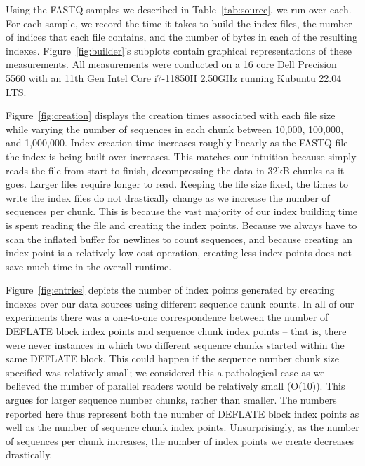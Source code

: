 Using the \gzip FASTQ samples we described in Table~\ref{tab:source}, we run
\ibuilder over each. For each sample, we record the time it takes to build the
index files, the number of indices that each file contains, and the number of
bytes in each of the resulting indexes. Figure~\ref{fig:builder}'s subplots
contain graphical representations of these measurements. All measurements were
conducted on a 16 core Dell Precision 5560 with an 11th Gen Intel Core i7-11850H
\@ 2.50GHz running Kubuntu 22.04 LTS.

Figure~\ref{fig:creation} displays the creation times associated with each file
size while varying the number of sequences in each chunk between 10,000,
100,000, and 1,000,000. Index creation time increases roughly linearly as the
\gzip FASTQ file the index is being built over increases. This matches our
intuition because \ibuilder simply reads the \gzip file from start to finish,
decompressing the data in 32kB chunks as it goes. Larger files require longer to
read. Keeping the file size fixed, the times to write the index files do not
drastically change as we increase the number of sequences per chunk. This is
because the vast majority of our index building time is spent reading the file
and creating the index points. Because we always have to scan the inflated
buffer for newlines to count sequences, and because creating an index point is a
relatively low-cost operation, creating less index points does not save much
time in the overall \ibuilder runtime.

Figure~\ref{fig:entries} depicts the number of index points generated by
creating indexes over our data sources using different sequence chunk counts. In
all of our experiments there was a one-to-one correspondence between the number
of \gzip DEFLATE block index points and sequence chunk index points -- that is,
there were never instances in which two different sequence chunks started within
the same DEFLATE block. This could happen if the sequence number chunk size
specified was relatively small; we considered this a pathological case as we
believed the number of parallel readers would be relatively small (O(10)). This
argues for larger sequence number chunks, rather than smaller. The numbers
reported here thus represent both the number of DEFLATE block index points as
well as the number of sequence chunk index points. Unsurprisingly, as the number
of sequences per chunk increases, the number of index points we create decreases
drastically.

